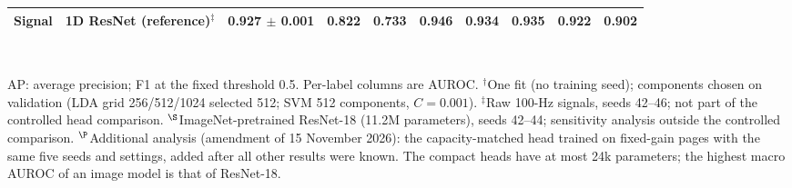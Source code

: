 \documentclass{wlscirep}
\begin{document}
\begin{table}[!t]
\begin{tabular}{llcccccccc}
\midrule
Signal & 1D ResNet (reference)$^\ddagger$ & 0.927 $\pm$ 0.001 & 0.822 & 0.733 & 0.946 & 0.934 & 0.935 & 0.922 & 0.902 \\
\bottomrule
\end{tabular}\\[2pt]
\begin{minipage}{0.95\textwidth}\scriptsize
AP: average precision; F1 at the fixed threshold 0.5. Per-label columns are AUROC. $^\dagger$One fit (no training seed); components chosen on validation (LDA grid 256/512/1024 selected 512; SVM 512 components, $C=0.001$). $^\ddagger$Raw 100-Hz signals, seeds 42--46; not part of the controlled head comparison. $^\S$ImageNet-pretrained ResNet-18 (11.2M parameters), seeds 42--44; sensitivity analysis outside the controlled comparison. $^\P$Additional analysis (amendment of 15 November 2026): the capacity-matched head trained on fixed-gain pages with the same five seeds and settings, added after all other results were known. The compact heads have at most 24k parameters; the highest macro AUROC of an image model is that of ResNet-18.
\end{minipage}
\end{table}
\end{document}
